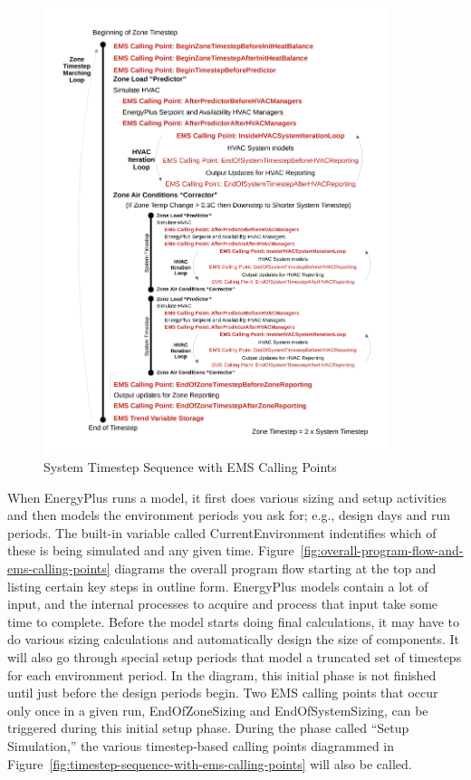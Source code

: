 \begin{figure}[hbtp] %
\centering
\includegraphics[width=0.9\textwidth, height=0.9\textheight, keepaspectratio=true]{media/image005.jpg}
\caption{System Timestep Sequence with EMS Calling Points \protect \label{fig:system-timestep-sequence-with-ems-calling}}
\end{figure}

When EnergyPlus runs a model, it first does various sizing and setup activities and then models the environment periods you ask for; e.g., design days and run periods. The built-in variable called CurrentEnvironment indentifies which of these is being simulated and any given time. Figure~\ref{fig:overall-program-flow-and-ems-calling-points} diagrams the overall program flow starting at the top and listing certain key steps in outline form. EnergyPlus models contain a lot of input, and the internal processes to acquire and process that input take some time to complete. Before the model starts doing final calculations, it may have to do various sizing calculations and automatically design the size of components. It will also go through special setup periods that model a truncated set of timesteps for each environment period. In the diagram, this initial phase is not finished until just before the design periods begin. Two EMS calling points that occur only once in a given run, EndOfZoneSizing and EndOfSystemSizing, can be triggered during this initial setup phase. During the phase called ``Setup Simulation,'' the various timestep-based calling points diagrammed in Figure~\ref{fig:timestep-sequence-with-ems-calling-points} will also be called.

